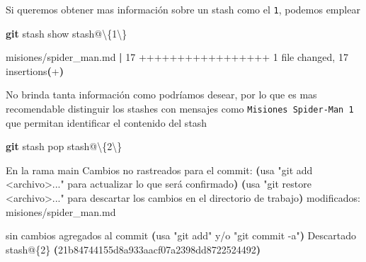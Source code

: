 \documentclass[
]{book}
\newenvironment{Shaded}{\begin{snugshade}}{\end{snugshade}}
\newcommand{\DataTypeTok}[1]{\textcolor[rgb]{0.13,0.29,0.53}{#1}}
\newcommand{\ErrorTok}[1]{\textcolor[rgb]{0.64,0.00,0.00}{\textbf{#1}}}
\newcommand{\ExtensionTok}[1]{#1}
\newcommand{\FunctionTok}[1]{\textcolor[rgb]{0.13,0.29,0.53}{\textbf{#1}}}
\newcommand{\KeywordTok}[1]{\textcolor[rgb]{0.13,0.29,0.53}{\textbf{#1}}}
\newcommand{\NormalTok}[1]{#1}
\newcommand{\StringTok}[1]{\textcolor[rgb]{0.31,0.60,0.02}{#1}}
\begin{document}
Si queremos obtener mas información sobre un stash como el \texttt{1}, podemos emplear

\begin{Shaded}
\begin{Highlighting}[]
\FunctionTok{git}\NormalTok{ stash show stash@}\DataTypeTok{\textbackslash{}\{}\NormalTok{1}\DataTypeTok{\textbackslash{}\}}
\end{Highlighting}
\end{Shaded}

\begin{Shaded}
\begin{Highlighting}[]
 \ExtensionTok{misiones/spider\_man.md} \KeywordTok{|} \ExtensionTok{17}\NormalTok{ +++++++++++++++++}
 \ExtensionTok{1}\NormalTok{ file changed, 17 insertions}\ErrorTok{(}\ExtensionTok{+}\KeywordTok{)}
\end{Highlighting}
\end{Shaded}

No brinda tanta información como podríamos desear, por lo que es mas recomendable distinguir los stashes con mensajes como \texttt{Misiones\ Spider-Man\ 1} que permitan identificar el contenido del stash

\begin{Shaded}
\begin{Highlighting}[]
\FunctionTok{git}\NormalTok{ stash pop stash@}\DataTypeTok{\textbackslash{}\{}\NormalTok{2}\DataTypeTok{\textbackslash{}\}}
\end{Highlighting}
\end{Shaded}

\begin{Shaded}
\begin{Highlighting}[]
\ExtensionTok{En}\NormalTok{ la rama main}
\ExtensionTok{Cambios}\NormalTok{ no rastreados para el commit:}
  \KeywordTok{(}\ExtensionTok{usa} \StringTok{"git add \textless{}archivo\textgreater{}..."}\NormalTok{ para actualizar lo que será confirmado}\KeywordTok{)}
  \KeywordTok{(}\ExtensionTok{usa} \StringTok{"git restore \textless{}archivo\textgreater{}..."}\NormalTok{ para descartar los cambios en el directorio de trabajo}\KeywordTok{)}
    \ExtensionTok{modificados:}\NormalTok{     misiones/spider\_man.md}

\ExtensionTok{sin}\NormalTok{ cambios agregados al commit }\ErrorTok{(}\ExtensionTok{usa} \StringTok{"git add"}\NormalTok{ y/o }\StringTok{"git commit {-}a"}\KeywordTok{)}
\ExtensionTok{Descartado}\NormalTok{ stash@\{2\} }\ErrorTok{(}\ExtensionTok{21b84744155d8a933aacf07a2398dd8722524492}\KeywordTok{)}
\end{Highlighting}
\end{Shaded}
\end{document}

